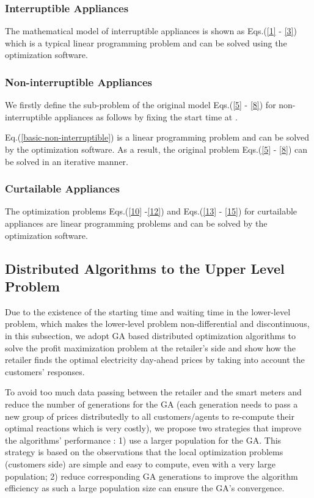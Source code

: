 \documentclass[10pt,journal]{IEEEtran}
\theoremstyle{definition}
\theoremstyle{plain} \newtheorem{theo}{Theorem} \newtheorem{prop}{Proposition}  \newtheorem{lemm}{Lemma}
\begin{document}
\subsubsection{ Interruptible Appliances}

The mathematical model of interruptible appliances is shown as Eqs.(\ref{1} - \ref{3}) which is a typical linear programming problem and can be solved using the optimization software. 

\subsubsection{Non-interruptible Appliances} 

We firstly define the sub-problem of the original model Eqs.(\ref{5} - \ref{8}) for non-interruptible appliances as follows by fixing the start time at .


Eq.(\ref{basic-non-interruptible}) is a linear programming problem and can be solved by the optimization software. As a result, the original problem Eqs.(\ref{5} - \ref{8}) can be solved in an iterative manner. 

\subsubsection{Curtailable Appliances}

The optimization problems Eqs.(\ref{10} -\ref{12}) and Eqs.(\ref{13} - \ref{15}) for curtailable appliances are linear programming problems and can be solved by the optimization software. 








\subsection{Distributed Algorithms to the Upper Level Problem}

Due to the existence of the starting time and waiting time in the lower-level problem, which makes the lower-level problem non-differential and  discontinuous, in this subsection, we adopt GA based distributed optimization algorithms to solve the profit maximization problem at the retailer's side and show how the retailer finds the optimal electricity day-ahead prices by taking into account the customers' responses. 





To avoid too much data passing between the retailer and the smart meters and reduce the number of generations for the GA (each generation needs to pass a new group of prices distributedly to all customers/agents to re-compute their optimal reactions which is very costly), we propose two strategies that improve the algorithms' performance : 1) use a larger population for the GA. This strategy is based on the observations that the local optimization problems (customers side) are simple and easy to compute, even with a very large population; 2) reduce corresponding GA generations to improve the algorithm efficiency as such a large population size can ensure the GA's convergence. 
\end{document}
